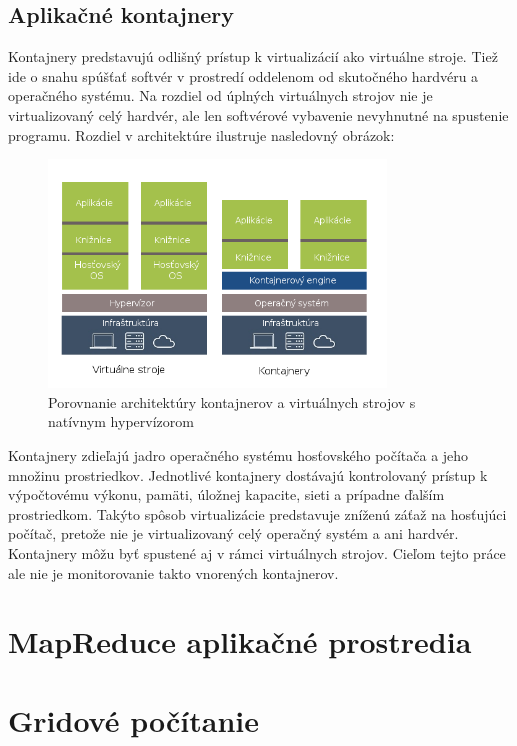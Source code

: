 \documentclass[12pt,twoside,color,cover,table]{fithesis3}
\begin{document}
\subsection{Aplikačné kontajnery}
Kontajnery predstavujú odlišný prístup k virtualizácií ako virtuálne stroje. Tiež ide o snahu spúšťať softvér v prostredí oddelenom od skutočného hardvéru a operačného systému. Na rozdiel od úplných virtuálnych strojov 
nie je virtualizovaný celý hardvér, ale len softvérové vybavenie nevyhnutné na spustenie programu. Rozdiel v architektúre ilustruje nasledovný obrázok: 
\begin{figure}[h]
\begin{center}
       \includegraphics[width=0.8\textwidth]{images/kontajnery-virtualky.png}
       \caption{Porovnanie architektúry kontajnerov a virtuálnych strojov s natívnym hypervízorom}
\end{center}
\end{figure}
Kontajnery zdieľajú jadro operačného systému hosťovského počítača a jeho množinu prostriedkov. Jednotlivé kontajnery dostávajú kontrolovaný prístup k výpočtovému výkonu, pamäti, úložnej kapacite, 
sieti a prípadne ďalším prostriedkom. Takýto spôsob virtualizácie predstavuje zníženú záťaž na hosťujúci počítač, pretože nie je virtualizovaný celý operačný systém a ani hardvér.
\\Kontajnery môžu byť spustené aj v rámci virtuálnych strojov. Cieľom tejto práce ale nie je monitorovanie takto vnorených kontajnerov.

\section{MapReduce aplikačné prostredia}

\section{Gridové počítanie}
\end{document}
